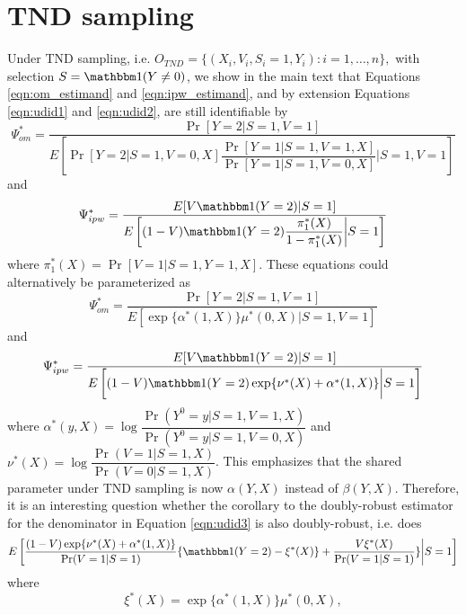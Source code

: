 \documentclass[12pt]{article}
\begin{document}
\section{TND sampling}
Under TND sampling, i.e. $O_{TND} = \{(X_i, V_i, S_i=1, Y_i) : i = 1, \ldots, n\},$ with selection $S = \mathbbm 1(Y\neq 0)$, 
we show in the main text that Equations \ref{eqn:om_estimand} and \ref{eqn:ipw_estimand}, and by extension Equations \ref{eqn:udid1} and \ref{eqn:udid2}, are still identifiable by
    \begin{equation}\label{eqn:om_estimand_tnd}
        \Psi_{om}^* = \dfrac{\Pr[Y = 2 | S = 1, V = 1]}{E\left[ \Pr[Y = 2 | S = 1, V = 0, X] \dfrac{\Pr[Y = 1 | S = 1, V = 1, X]}{\Pr[Y = 1| S = 1, V = 0, X]}\Big| S = 1, V = 1 \right]}
    \end{equation}
    and 
    \begin{equation}\label{eqn:ipw_estimand_tnd}
        \Psi_{ipw}^* = \dfrac{E[V \mathbbm 1 (Y = 2)|S =1]}{E\left[ (1 - V) \mathbbm 1 (Y = 2) \dfrac{\pi^*_1(X)}{1 - \pi^*_1(X)} \bigg| S = 1\right]}
    \end{equation}
    where $\pi^*_1(X) = \Pr[V = 1| S = 1, Y = 1, X]$. These equations could alternatively be parameterized as 
    \begin{equation}\label{eqn:om_estimand_tnd}
        \Psi_{om}^* = \dfrac{\Pr[Y = 2 | S = 1, V = 1]}{E\left[  \exp\{\alpha^*(1,X)\} \mu^*(0,X)\Big| S = 1, V = 1 \right]}
    \end{equation}
    and 
    \begin{equation}\label{eqn:ipw_estimand_tnd}
        \Psi_{ipw}^* = \dfrac{E[V \mathbbm 1 (Y = 2)|S =1]}{E\left[ (1 - V) \mathbbm 1 (Y = 2) \exp\{\nu^*(X) + \alpha^*(1,X)\} \bigg| S = 1\right]}
    \end{equation}
    where $\alpha^*(y,X) = \log \dfrac{\Pr(Y^0=y|S=1, V=1,X)}{\Pr(Y^0=y|S=1,V=0,X)}$ and $\nu^*(X) = \log \dfrac{\Pr(V=1|S=1,X)}{\Pr(V=0|S=1,X)}$. This emphasizes that the shared parameter under TND sampling is now $\alpha(Y,X)$ instead of $\beta(Y,X)$.
    Therefore, it is an interesting question whether the corollary to the doubly-robust estimator for the denominator in Equation \ref{eqn:udid3} is also doubly-robust, i.e. does
    \begin{equation}\label{eqn:udid4}
     E\left[\dfrac{(1 - V)\exp\{\nu^*(X) + \alpha^*(1,X)\}}{\Pr(V=1|S=1)} \{\mathbbm 1(Y = 2) - \xi^*(X)\} + \dfrac{V\xi^*(X)}{\Pr(V=1|S=1)}\} \bigg| S=1  \right]
    \end{equation}
    where 
    \[\xi^*(X) = \exp\{\alpha^*(1,X)\} \mu^*(0,X),\]
\end{document}
